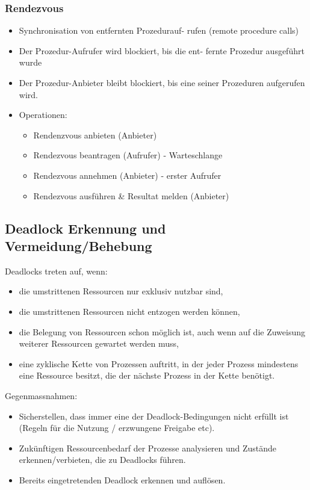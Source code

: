\documentclass[a4paper, 10pt]{article}
\begin{document}
\subsubsection{Rendezvous}
\begin{itemize}
	\item Synchronisation von entfernten Prozedurauf- rufen (remote procedure calls)
	\item Der Prozedur-Aufrufer wird blockiert, bis die ent- fernte Prozedur ausgeführt wurde
	\item Der Prozedur-Anbieter bleibt blockiert, bis eine seiner Prozeduren aufgerufen wird.
	\item Operationen:
		\begin{itemize}
			\item Rendenzvous anbieten (Anbieter)
			\item Rendezvous beantragen (Aufrufer) - Warteschlange
			\item Rendezvous annehmen (Anbieter) - erster Aufrufer
			\item Rendezvous ausführen \& Resultat melden (Anbieter)
		\end{itemize}
\end{itemize}

\subsection{Deadlock Erkennung und Vermeidung/Behebung}
Deadlocks treten auf, wenn:
\begin{itemize}
	\item die umstrittenen Ressourcen nur exklusiv nutzbar sind,
	\item die umstrittenen Ressourcen nicht entzogen werden können,
	\item die Belegung von Ressourcen schon möglich ist, auch wenn auf die Zuweisung weiterer Ressourcen gewartet werden muss,
	\item eine zyklische Kette von Prozessen auftritt, in der jeder Prozess mindestens eine Ressource besitzt, die der nächste Prozess in der Kette benötigt.
\end{itemize}
Gegenmassnahmen:
\begin{itemize}
	\item Sicherstellen, dass immer eine der Deadlock-Bedingungen nicht erfüllt ist (Regeln für die Nutzung / erzwungene Freigabe etc).
	\item Zukünftigen Ressourcenbedarf der Prozesse analysieren und Zustände erkennen/verbieten, die zu Deadlocks führen.
	\item Bereits eingetretenden Deadlock erkennen und auflösen.
\end{itemize}
\end{document}

